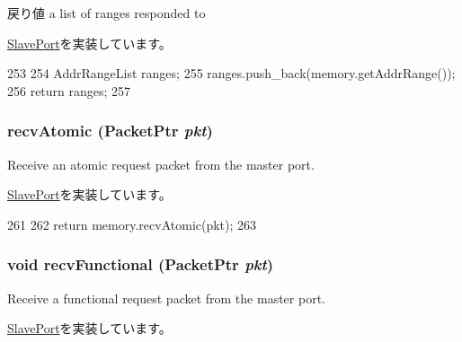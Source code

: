 \begin{DoxyReturn}{戻り値}
a list of ranges responded to 
\end{DoxyReturn}


\hyperlink{classSlavePort_a6e967f8921e80748eb2be35b6b481a7e}{SlavePort}を実装しています。


\begin{DoxyCode}
253 {
254     AddrRangeList ranges;
255     ranges.push_back(memory.getAddrRange());
256     return ranges;
257 }
\end{DoxyCode}
\hypertarget{classSimpleMemory_1_1MemoryPort_a5f0b4c4a94f6b0053f9d7a4eb9c2518a}{
\subsubsection[{recvAtomic}]{ recvAtomic ({\bf PacketPtr} {\em pkt})}}
\label{classSimpleMemory_1_1MemoryPort_a5f0b4c4a94f6b0053f9d7a4eb9c2518a}
Receive an atomic request packet from the master port. 

\hyperlink{classSlavePort_a428ab07671bc9372dc44a2487b12a726}{SlavePort}を実装しています。


\begin{DoxyCode}
261 {
262     return memory.recvAtomic(pkt);
263 }
\end{DoxyCode}
\hypertarget{classSimpleMemory_1_1MemoryPort_aeefa907fb6d6a787e6dab90e8138ea90}{
\subsubsection[{recvFunctional}]{\setlength{\rightskip}{0pt plus 5cm}void recvFunctional ({\bf PacketPtr} {\em pkt})}}
\label{classSimpleMemory_1_1MemoryPort_aeefa907fb6d6a787e6dab90e8138ea90}
Receive a functional request packet from the master port. 

\hyperlink{classSlavePort_a6a3d6f2e5dab6bed16d53d9e7c17378d}{SlavePort}を実装しています。


